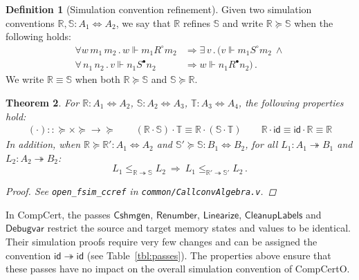 \documentclass[11pt,oneside]{book}
\newtheorem{theorem}{Theorem}[chapter]
\theoremstyle{definition}
\newtheorem{definition}[theorem]{Definition}
\newcommand{\kw}[1]{\ensuremath{ \mathsf{#1} }}
\newcommand{\que}{\circ}         %
\newcommand{\ans}{\bullet}       %
\newcommand{\scref}{\succeq} %
\begin{document}
\begin{definition}[Simulation convention refinement] %
Given two simulation conventions
$\mathbb{R}, \mathbb{S} : A_1 \Leftrightarrow A_2$,
we say that
$\mathbb{R}$ refines $\mathbb{S}$ and write
$\mathbb{R} \scref \mathbb{S}$
when the following holds:
\begin{align*}
  \forall w \, m_1 \, m_2 \,.\,
  w \Vdash m_1 \mathrel{R^\que} m_2 &\Rightarrow
  \exists \, v \,.\, (
  v \Vdash m_1 \mathrel{S^\que} m_2
  \: \wedge \\
  \forall \, n_1 \, n_2 \,.\,
  v \Vdash n_1 \mathrel{S^\ans} n_2 &\Rightarrow
  w \Vdash n_1 \mathrel{R^\ans} n_2) \,.
\end{align*}
We write $\mathbb{R} \equiv \mathbb{S}$ when both
$\mathbb{R} \scref \mathbb{S}$ and
$\mathbb{S} \scref \mathbb{R}$.
\end{definition}

\begin{theorem} %
For
$\mathbb{R} : A_1 \Leftrightarrow A_2$,
$\mathbb{S} : A_2 \Leftrightarrow A_3$,
$\mathbb{T} : A_3 \Leftrightarrow A_4$,
the following properties hold:
\begin{gather*}
  ({\cdot}) :: {{\scref} \times {\scref} \rightarrow {\scref}}
  \qquad
  (\mathbb{R} \cdot \mathbb{S}) \cdot \mathbb{T} \equiv
    \mathbb{R} \cdot (\mathbb{S} \cdot \mathbb{T})
  \qquad
  \mathbb{R} \cdot \kw{id} \equiv
  \kw{id} \cdot \mathbb{R} \equiv
  \mathbb{R}
\end{gather*}
In addition, when
$\mathbb{R} \scref \mathbb{R}' : A_1 \Leftrightarrow A_2$ and
$\mathbb{S}' \scref \mathbb{S} : B_1 \Leftrightarrow B_2$,
for all
$L_1 : A_1 \twoheadrightarrow B_1$ and $L_2 : A_2 \twoheadrightarrow B_2$:
\[
      L_1 \le_{\mathbb{R} \twoheadrightarrow \mathbb{S}} L_2
      \: \Rightarrow \:
      L_1 \le_{\mathbb{R}' \twoheadrightarrow \mathbb{S}'} L_2 \,.
\]
\begin{proof}
See \texttt{open\_fsim\_ccref} in \texttt{common/CallconvAlgebra.v}.
\end{proof}
\end{theorem}

In CompCert,
the passes \kw{Cshmgen}, \kw{Renumber}, \kw{Linearize},
\kw{CleanupLabels} and \kw{Debugvar}
restrict the source and target
memory states and values to be identical.
Their simulation proofs require very few changes
and can be assigned the convention $\kw{id} \twoheadrightarrow \kw{id}$
(see Table~\ref{tbl:passes}).
The properties above ensure that these passes
have no impact on the overall simulation convention
of CompCertO.
\end{document}
